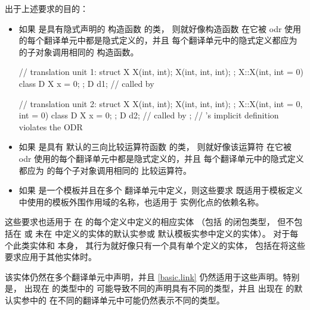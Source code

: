 \pnum
出于上述要求的目的：

\begin{itemize}
\item 如果  是具有隐式声明的
构造函数 的类，
则就好像构造函数
在它被 odr 使用的每个翻译单元中都是隐式定义的，并且
每个翻译单元中的隐式定义都应为  的子对象调用相同的
构造函数。
\begin{example}
\begin{codeblock}
// translation unit 1:
struct X {
  X(int, int);
  X(int, int, int);
};
X::X(int, int = 0) { }
class D {
  X x = 0;
};
D d1;                           //  called by 

// translation unit 2:
struct X {
  X(int, int);
  X(int, int, int);
};
X::X(int, int = 0, int = 0) { }
class D {
  X x = 0;
};
D d2;                           //  called by ;
                                // 's implicit definition violates the ODR
\end{codeblock}
\end{example}

\item 如果  是具有
默认的三向比较运算符函数 的类，
则就好像该运算符
在它被 odr 使用的每个翻译单元中都是隐式定义的，并且
每个翻译单元中的隐式定义都应为  的每个子对象调用相同的
比较运算符。

\item
如果  是一个模板并且在多个
翻译单元中定义，则这些要求
既适用于模板定义中使用的模板外围作用域的名称，也适用于
实例化点的依赖名称。
\end{itemize}

\pnum
这些要求也适用于
在  的每个定义中定义的相应实体
（包括  的闭包类型，
但不包括在  或
未在  中定义的实体的默认实参或
默认模板实参中定义的实体）。
对于每个此类实体和  本身，
其行为就好像只有一个具有单个定义的实体，
包括在将这些要求应用于其他实体时。
\begin{note}
该实体仍然在多个翻译单元中声明，并且 \ref{basic.link}
仍然适用于这些声明。特别是，
出现在  的类型中的 
可能导致不同的声明具有不同的类型，并且
出现在  的默认实参中的 
在不同的翻译单元中可能仍然表示不同的类型。
\end{note}

